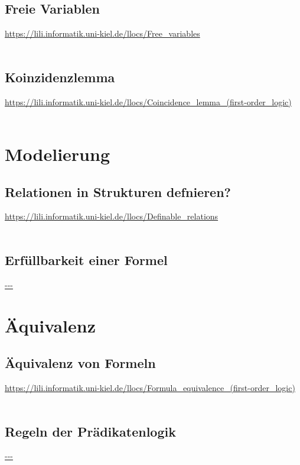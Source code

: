 \documentclass[twocolumn]{article}
\begin{document}
    \subsection{Freie Variablen}
    \url{https://lili.informatik.uni-kiel.de/llocs/Free_variables}\\\\

    \subsection{Koinzidenzlemma}
    \url{https://lili.informatik.uni-kiel.de/llocs/Coincidence_lemma_(first-order_logic)}\\\\

    \section{Modelierung}

    \subsection{Relationen in Strukturen defnieren?}
    \url{https://lili.informatik.uni-kiel.de/llocs/Definable_relations}\\\\

    \subsection{Erfüllbarkeit einer Formel}
    \url{---}\\

    \section{Äquivalenz}

    \subsection{Äquivalenz von Formeln}
    \url{https://lili.informatik.uni-kiel.de/llocs/Formula_equivalence_(first-order_logic)}\\\\

    \subsection{Regeln der Prädikatenlogik}
    \url{---}\\
\end{document}

